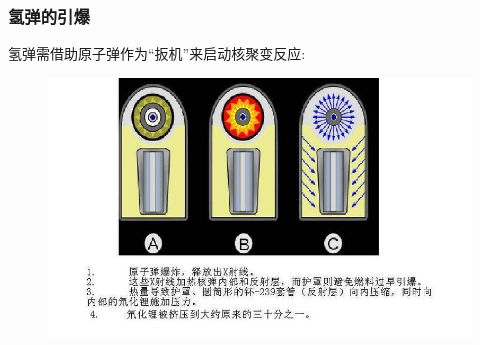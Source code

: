 \begin{frame}
    \frametitle{氢弹的引爆}
    氢弹需借助原子弹作为``扳机''来启动核聚变反应:
    \vspace{-0.1cm}
    \begin{figure}
        \includegraphics[width=1.0\textwidth]{Figures_History/U-T_design-2.jpg}
    \end{figure}
\end{frame}

